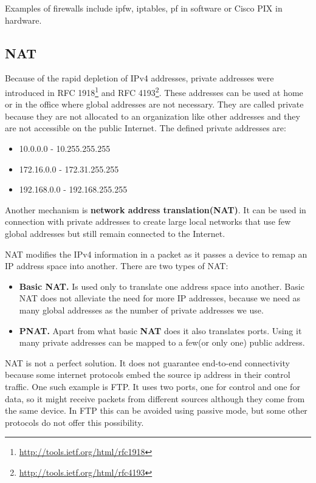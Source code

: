 Examples of firewalls include ipfw, iptables, pf in software or Cisco PIX in hardware.


\subsection{NAT}
\label{sub-sec:nat}

Because of the rapid depletion of IPv4 addresses, private addresses were introduced in 
RFC 1918\footnote{\url{http://tools.ietf.org/html/rfc1918}} and RFC 4193\footnote{\url{http://tools.ietf.org/html/rfc4193}}. 
These addresses can be used at home or in the office where global addresses are not necessary. They are called 
private because they are not allocated to an organization like other addresses and they are not accessible on the 
public Internet. The defined private addresses are:
\begin{itemize}
  \item 10.0.0.0 - 10.255.255.255
  \item 172.16.0.0 - 172.31.255.255
  \item 192.168.0.0 - 192.168.255.255
\end{itemize}

Another mechanism is \textbf{network address translation(NAT)}. It can be used in connection with private addresses to create
large local networks that use few global addresses but still remain connected to the Internet. 

NAT modifies the IPv4 information in a packet as it passes a device to remap an IP address space into another. There are two types of
NAT:
\begin{itemize}
  \item \textbf{Basic NAT.} Is used only to translate one address space into another. Basic NAT does not alleviate the need
for more IP addresses, because we need as many global addresses as the number of private addresses we use.
  \item \textbf{PNAT.} Apart from what basic \textbf{NAT} does it also translates ports. Using it many private addresses can be mapped
to a few(or only one) public address.
\end{itemize}


NAT is not a perfect solution. It does not guarantee end-to-end connectivity because some internet protocols embed the source
ip address in their control traffic. One such example is FTP. It uses two ports, one for control and one for data, so it might receive
packets from different sources although they come from the same device. In FTP this can be avoided using passive mode, but some other 
protocols do not offer this possibility.

